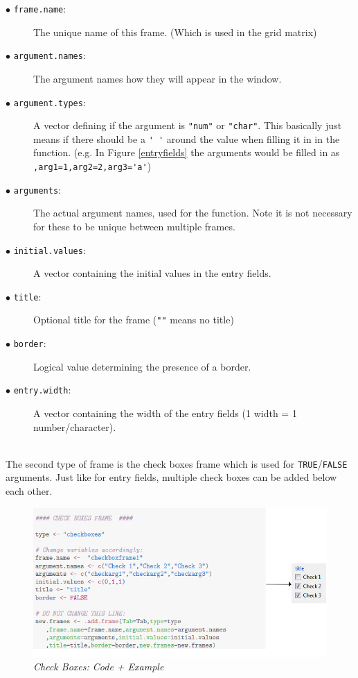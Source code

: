 \documentclass[a4paper]{article}\usepackage[]{graphicx}\usepackage[]{color}
\begin{document}
\begin{description}
  \item[$\bullet$ \texttt{frame.name}:] The unique name of this frame. (Which is used in the grid matrix)
  \item[$\bullet$ \texttt{argument.names}:] The argument names how they will
  appear in the window.
  \item[$\bullet$ \texttt{argument.types}:] A vector defining if the argument is
  \verb|"num"| or \verb|"char"|. This basically just means if there should be a
  \verb|' '| around the value when filling it in in the function. (e.g. In
  Figure \ref{entryfields} the arguments would be filled in as \verb|,arg1=1,arg2=2,arg3='a'|)
  \item[$\bullet$ \texttt{arguments}:] The actual argument names, used for the
  function. Note it is not necessary for these to be unique between multiple
  frames.
  \item[$\bullet$ \texttt{initial.values}:] A vector containing the initial
  values in the entry fields.
  \item[$\bullet$ \texttt{title}:] Optional title for the frame (\verb|""| means no title)
  \item[$\bullet$ \texttt{border}:] Logical value determining the presence of a
  border.
  \item[$\bullet$ \texttt{entry.width}:] A vector containing the width of the
  entry fields (1 width = 1 number/character).
\end{description}

\\
The second type of frame is the check boxes frame which is used for
\verb|TRUE|/\verb|FALSE| arguments. Just like for entry fields, multiple check
boxes can be added below each other. 
\begin{figure}[H]
\centering
\includegraphics[scale=0.5]{figures/checkboxes.png}
\caption{{\it Check Boxes: Code + Example}
\label{checkboxes}}
\end{figure}
\end{document}
